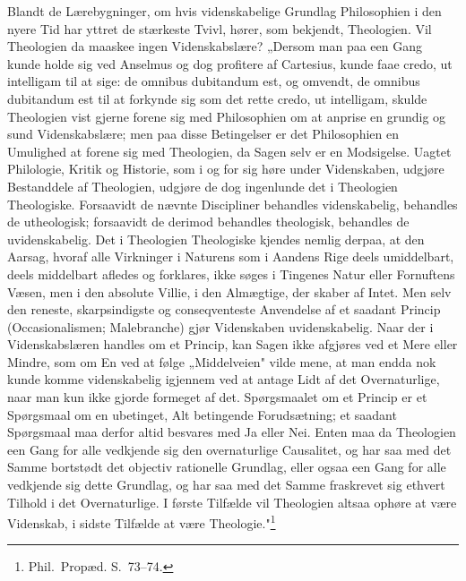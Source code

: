 \documentclass[12pt]{book}
\begin{document}
Blandt de Lærebygninger, om hvis videnskabelige Grundlag Philosophien i den nyere
Tid har yttret de stærkeste Tvivl, hører, som bekjendt, Theologien. Vil Theologien
da maaskee ingen Videnskabslære? „Dersom man paa een Gang kunde holde sig ved
Anselmus og dog profitere af Cartesius, kunde faae credo, ut intelligam til at
sige: de omnibus dubitandum est, og omvendt, de omnibus dubitandum est til at
forkynde sig som det rette credo, ut intelligam, skulde Theologien vist gjerne
forene sig med Philosophien om at anprise en grundig og sund Videnskabslære; men
paa disse Betingelser er det Philosophien en Umulighed at forene sig med
Theologien, da Sagen selv er en Modsigelse. Uagtet Philologie, Kritik og Historie,
som i og for sig høre under Videnskaben, udgjøre Bestanddele af Theologien, udgjøre
de dog ingenlunde det i Theologien Theologiske. Forsaavidt de nævnte Discipliner
behandles videnskabelig, behandles de utheologisk; forsaavidt de derimod behandles
theologisk, behandles de uvidenskabelig. Det i Theologien Theologiske kjendes
nemlig derpaa, at den Aarsag, hvoraf alle Virkninger i Naturens som i Aandens Rige
deels umiddelbart, deels middelbart afledes og forklares, ikke søges i Tingenes
Natur eller Fornuftens Væsen, men i den absolute Villie, i den Almægtige, der
skaber af Intet. Men selv den reneste, skarpsindigste og conseqventeste Anvendelse
af et saadant Princip (Occasionalismen; Malebranche) gjør Videnskaben
uvidenskabelig. Naar
der i Videnskabslæren handles om et Princip, kan Sagen ikke afgjøres ved et Mere
eller Mindre, som om En ved at følge „Middelveien" vilde mene, at man endda nok
kunde komme videnskabelig igjennem ved at antage Lidt af det Overnaturlige, naar
man kun ikke gjorde formeget af det. Spørgsmaalet om et Princip er et Spørgsmaal om
en ubetinget, Alt betingende Forudsætning; et saadant Spørgsmaal maa derfor altid
besvares med Ja eller Nei. Enten maa da Theologien een Gang for alle vedkjende sig
den overnaturlige Causalitet, og har saa med det Samme bortstødt det objectiv
rationelle Grundlag, eller ogsaa een Gang for alle vedkjende sig dette Grundlag, og
har saa med det Samme fraskrevet sig ethvert Tilhold i det Overnaturlige. I første
Tilfælde vil Theologien altsaa ophøre at være Videnskab, i sidste Tilfælde at være
Theologie."\footnote{Phil.\ Propæd. S.~73--74.}
\end{document}
